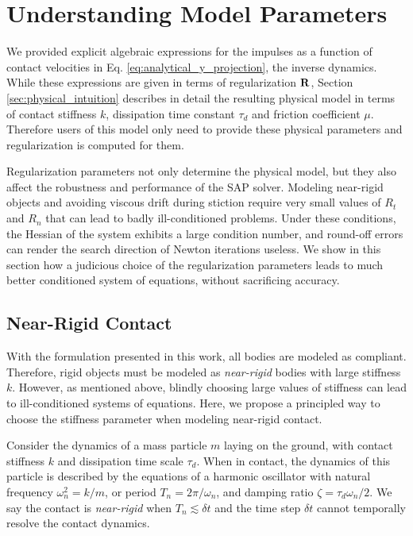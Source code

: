
\section{Understanding Model Parameters}
\label{sec:understanding_model_parameters}

We provided explicit algebraic expressions for the impulses as a function of
contact velocities in Eq. \eqref{eq:analytical_y_projection}, the inverse
dynamics. While these expressions are given in terms of regularization ${\mathbf{R}}$,
Section \ref{sec:physical_intuition} describes in detail the resulting physical
model in terms of contact stiffness $k$, dissipation time constant $\tau_d$ and
friction coefficient $\mu$. Therefore users of this model only need to provide
these physical parameters and regularization is computed for them.

Regularization parameters not only determine the physical model, but
they also affect the robustness and performance of the SAP solver. Modeling near-rigid
objects and avoiding viscous drift during stiction require very small values of
$R_t$ and $R_n$ that can lead to badly ill-conditioned problems. Under these
conditions, the Hessian of the system exhibits a large condition number, and
round-off errors can render the search direction of Newton iterations
useless. We show in this section how a judicious choice of the regularization
parameters leads to much better conditioned system of equations, without
sacrificing accuracy.

\subsection{Near-Rigid Contact}

With the formulation presented in this work, all bodies are modeled as compliant.
Therefore, rigid objects must be modeled as \emph{near-rigid} bodies with large
stiffness $k$. However, as mentioned above, blindly choosing large values of stiffness can
lead to ill-conditioned systems of equations. Here, we propose a principled way
to choose the stiffness parameter when modeling near-rigid contact.

Consider the dynamics of a mass particle $m$ laying on the ground, with contact
stiffness $k$ and dissipation time scale $\tau_d$. When in contact, the dynamics
of this particle is described by the equations of a harmonic oscillator with
natural frequency $\omega_n^2 = k/m$, or period $T_n = 2\pi/\omega_n$, and
damping ratio $\zeta=\tau_d\omega_n/2$. We say the contact is \emph{near-rigid}
when $T_n \lesssim \delta t$ and the time step $\delta t$ cannot temporally
resolve the contact dynamics. 

